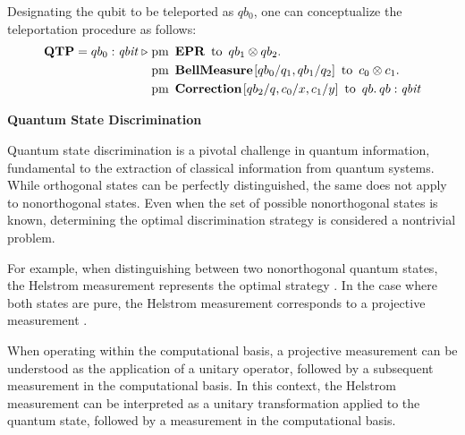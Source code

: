 \documentclass[10pt,a4paper]{amsart}
\theoremstyle{definition}
\theoremstyle{definition}
\theoremstyle{definition}
\theoremstyle{definition}
\theoremstyle{definition}
\theoremstyle{definition}
\begin{document}
 Designating the qubit to be teleported as $qb_0$, one can conceptualize the teleportation procedure as follows:
 \begin{align*}
  \textbf{QTP} = qb_{0}: \textit{qbit}\hspace{3 pt} \triangleright \hspace{3 pt} & \text{pm} \hspace{5pt} \textbf{EPR} \hspace{5pt} \text{to} \hspace{5pt}  qb_{1} \otimes qb_{2}.  \notag \\
     & \text{pm}\hspace{5pt} \textbf{BellMeasure} \hspace{1pt} [qb_0/q_1,qb_{1}/q_2] \hspace{5pt}  \text{to} \hspace{5pt} c_{0}\otimes c_{1} . \notag \\
     & \text{pm} \hspace{5pt}  \textbf{Correction} \hspace{1pt} [qb_{2}/q,c_{0}/x, c_{1}/y]  \hspace{5pt} \text{to} \hspace{5pt}  qb. \hspace{2pt}  qb : \textit{qbit} 
 \end{align*}


    \vspace{10pt}

\textbf{Quantum State Discrimination}


Quantum state discrimination is a pivotal challenge in quantum information, fundamental to the extraction of classical information from quantum systems. While orthogonal states can be perfectly distinguished, the same does not apply to nonorthogonal states. 
Even when the set of possible nonorthogonal states is known, determining the optimal discrimination strategy is considered a nontrivial problem.

For example, when distinguishing between two nonorthogonal quantum states, the Helstrom measurement represents the optimal strategy \cite{helstromQuantumDetectionEstimation1976}. In the case where both states are pure, the Helstrom measurement corresponds to a projective measurement \cite{barnett2009quantum}.

When operating within the computational basis, a projective measurement can be understood as the application of a unitary operator, followed by a subsequent measurement in the computational basis. In this context, the Helstrom measurement can be interpreted as a unitary transformation applied to the quantum state, followed by a measurement in the computational basis. 
\end{document}
